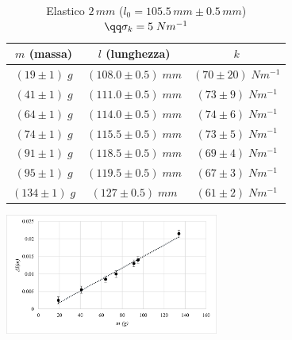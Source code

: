 
\begin{table}[h]
    \begin{subtable}[h]{0.45\textwidth}
    \begin{tabular}{|c|c|c|}
        \hline
        $m$ (massa) & $l$ (lunghezza) & $k$\\
        \hline

        $(19 \pm 1)\; g$  & $(108.0\pm 0.5) \;mm$ & $(70 \pm 20)\; Nm^{-1}$\\ 
        $(41 \pm 1)\; g$  & $(111.0 \pm 0.5) \;mm$ & $(73 \pm 9)\; Nm^{-1}$\\
        $(64 \pm 1)\; g$  & $(114.0 \pm 0.5) \;mm$ & $(74 \pm 6)\; Nm^{-1}$\\  
        $(74 \pm 1)\; g$  & $(115.5 \pm 0.5) \;mm$ & $(73 \pm 5)\; Nm^{-1}$\\ 
        $(91 \pm 1)\; g$  & $(118.5 \pm 0.5) \;mm$ & $(69 \pm 4)\; Nm^{-1}$\\ 
        $(95 \pm 1)\; g$  & $(119.5 \pm 0.5) \;mm$ & $(67 \pm 3)\; Nm^{-1}$\\ 
        $(134 \pm 1)\; g$  & $(127 \pm 0.5) \;mm$ & $(61 \pm 2)\; Nm^{-1}$\\ 


        \hline
    \end{tabular}
    \end{subtable}
    \hfill
    \begin{subtable}[h]{0.45\textwidth}
        \includegraphics[width = 7cm]{plots/plt2mm.png}
    \end{subtable}
    \caption{Elastico $2\,mm$ ($l_0 = 105.5\, mm \pm 0.5\,mm$)$\qq \sigma_k = 5\; Nm^{-1}$}
    \label{tabellaElasitco2}
\end{table}

